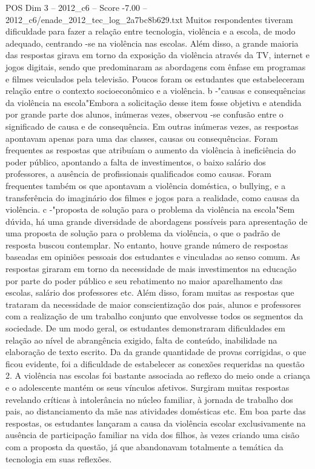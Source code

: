 \begin{textsample}{POS Dim 3 – 2012\_c6 – Score -7.00 – 2012\_c6/enade\_2012\_tec\_log\_2a7bc8b629.txt}
Muitos respondentes tiveram dificuldade para fazer a relação entre tecnologia, violência e a escola, de modo adequado, centrando -se na violência nas escolas.
Além disso, a grande maioria das respostas girava em torno da exposição da violência através da TV, internet e jogos digitais, sendo que predominaram as abordagens com ênfase em programas e filmes veiculados pela televisão.
Poucos foram os estudantes que estabeleceram relação entre o contexto socioeconômico e a violência. b -"causas e consequências da violência na escola"Embora a solicitação desse item fosse objetiva e atendida por grande parte dos alunos, inúmeras vezes, observou -se confusão entre o significado de causa e de consequência.
Em outras inúmeras vezes, as respostas apontavam apenas para uma das classes, causas ou consequências.
Foram frequentes as respostas que atribuíam o aumento da violência à ineficiência do poder público, apontando a falta de investimentos, o baixo salário dos professores, a ausência de profissionais qualificados como causas.
Foram frequentes também os que apontavam a violência doméstica, o bullying, e a transferência do imaginário dos filmes e jogos para a realidade, como causas da violência. c -"proposta de solução para o problema da violência na escola"Sem dúvida, há uma grande diversidade de abordagens possíveis para apresentação de uma proposta de solução para o problema da violência, o que o padrão de resposta buscou contemplar.
No entanto, houve grande número de respostas baseadas em opiniões pessoais dos estudantes e vinculadas ao senso comum.
As respostas giraram em torno da necessidade de mais investimentos na educação por parte do poder público e seu rebatimento no maior aparelhamento das escolas, salário dos professores etc.
Além disso, foram muitas as respostas que trataram da necessidade de maior conscientização dos pais, alunos e professores com a realização de um trabalho conjunto que envolvesse todos os segmentos da sociedade.
De um modo geral, os estudantes demonstraram dificuldades em relação ao nível de abrangência exigido, falta de conteúdo, inabilidade na elaboração de texto escrito.
Da da grande quantidade de provas corrigidas, o que ficou evidente, foi a dificuldade de estabelecer as conexões requeridas na questão 2.
A violência nas escolas foi bastante associada ao reflexo do meio onde a criança e o adolescente mantém os seus vínculos afetivos.
Surgiram muitas respostas revelando críticas à intolerância no núcleo familiar, à jornada de trabalho dos pais, ao distanciamento da mãe nas atividades domésticas etc.
Em boa parte das respostas, os estudantes lançaram a causa da violência escolar exclusivamente na ausência de participação familiar na vida dos filhos, às vezes criando uma cisão com a proposta da questão, já que abandonavam totalmente a temática da tecnologia em suas reflexões.

\end{textsample}
